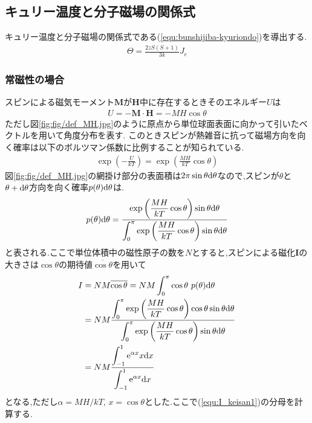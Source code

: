 \subsection{キュリー温度と分子磁場の関係式}
キュリー温度と分子磁場の関係式である(\ref{equ:bunshijiba-kyuriondo})を導出する.
\begin{align}
  \label{equ:bunshijiba-kyuriondo}
  \Theta=\frac{2zS(S+1)}{3k}J_e
\end{align}
\subsubsection{常磁性の場合}
スピンによる磁気モーメント${\bm M}$が${\bm H}$中に存在するときそのエネルギー$U$は
\begin{align}
  \label{equ:U}
  U=-\bm{M\cdot H}=-MH\cos\theta
\end{align}
ただし図\ref{fig:fig/def_MH.jpg}のように原点から単位球面表面に向かって引いたベクトルを用いて角度分布を表す.
このときスピンが熱雑音に抗って磁場方向を向く確率は以下のボルツマン係数に比例することが知られている\cite{alma990008542450204034}.
\begin{align}
  \exp\left(-\frac{U}{kT}\right)=\exp\left(\frac{MH}{kT}\cos\theta\right)
\end{align}
図\ref{fig:fig/def_MH.jpg}の網掛け部分の表面積は$2\pi\sin\theta{\rm d}\theta$なので,スピンが$\theta$と$\theta+{\rm d}\theta$方向を向く確率$p(\theta){\rm d}\theta$は.
\begin{align}
  p(\theta){\rm d}\theta=\frac{\displaystyle \exp\left(\frac{MH}{kT}\cos\theta\right)\sin\theta{\rm d}\theta}{\displaystyle \int_0^\pi\exp\left(\frac{MH}{kT}\cos\theta\right)\sin\theta{\rm d}\theta}
\end{align}
と表される.ここで単位体積中の磁性原子の数を$N$とすると,スピンによる磁化$\bm{I}$の大きさは$\cos\theta$の期待値$\overline{\cos\theta}$を用いて
\begin{align}
  \label{equ:I_keisan1}
  I&=NM\overline{\cos\theta}
  =NM\int_0^\pi \cos\theta\ p(\theta){\rm d}\theta\nonumber\\
  &=NM\frac{\displaystyle \int_0^\pi\exp\left(\frac{MH}{kT}\cos\theta\right)\cos\theta\sin\theta{\rm d}\theta}{\displaystyle \int_0^\pi\exp\left(\frac{MH}{kT}\cos\theta\right)\sin\theta{\rm d}\theta}\nonumber\\
  &=NM\frac{\displaystyle \int_{-1}^1{\rm e}^{\alpha x}x{\rm d}x}{\displaystyle \int_{-1}^{1}{\rm e}^{\alpha x}{\rm d}x}
\end{align}
となる,ただし$\alpha=MH/kT$, $x=\cos\theta$とした.ここで(\ref{equ:I_keisan1})の分母を計算する.
